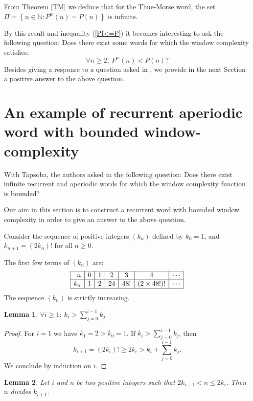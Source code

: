 \documentclass[a4 paper,12pt]{article}
\newtheorem{lemma}{Lemma}[section]
\begin{document}
 


 

From Theorem \ref{TM} we deduce that for the Thue-Morse word, the  set $\Pi=\left\{n\in \mathbb{N}: P^{w}(n)=P(n) \right\}$ is infinite.

 By this result  and   inequality (\ref{Pf<=P}) it becomes interesting to ask the following question:
 Does there exist some words for which the window complexity satisfies:
 $$\forall n\geq 2, \ P^{w}(n)<P(n)?$$
 Besides giving a response to a question asked in \cite{9}, we provide in the next Section a positive answer to the above question. 
 
\section{An example of recurrent aperiodic word with bounded window-complexity}

  With Tapsoba,  the authors asked  in \cite{9} the following question: Does there exist infinite recurrent and aperiodic words for which  the window complexity function is bounded?

Our aim in this section is to construct a recurrent word with bounded window complexity in order to give an answer to the above question.

Consider the sequence of positive integers $\left(k_n\right)$ defined by $k_0=1$, and  $k_{n+1}= \left(2k_n\right)!$ for all $n\geq 0$. 

The first few terms of $(k_n)$  are:
$$
\begin{array}{|r|c|c|c|c|c|c|}
	\hline
	n	&0&1&2&3&4&\cdots\\
	\hline
	k_n	&1&2&24&48!& \left(2\times 48!\right) ! &\cdots\\
	\hline
\end{array}
$$
 The sequence $\left(k_n\right)$ is strictly increasing.


\begin{lemma}
$\forall i\geq 1:\ k_i>\sum_{j=0}^{i-1}k_j$
\end{lemma}



\begin{proof} 
For $i=1$ we have $k_1=2>k_0=1$. If $ k_i>\sum_{j=0}^{i-1}k_j$, then
$$k_{i+1}=\left(2k_i\right)!\geq 2k_i>k_i+\sum_{j=0}^{i-1}k_j.$$
We conclude by induction on $i$. \end{proof}


\begin{lemma} \label{divide}
Let $i$ and $ n$ be two positive integers such that $2k_{i-1}<n\leq 2k_i$. Then $n$ divides $k_{i+1}$.
\end{lemma}
\end{document}
